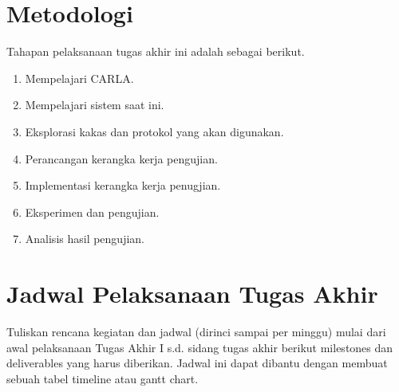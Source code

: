 \section{Metodologi}


Tahapan pelaksanaan tugas akhir ini adalah sebagai berikut.

\begin{enumerate}
	\item Mempelajari CARLA.
	\item Mempelajari sistem saat ini.
	\item Eksplorasi kakas dan protokol yang akan digunakan.
	\item Perancangan kerangka kerja pengujian.
	\item Implementasi kerangka kerja penugjian.
	\item Eksperimen dan pengujian.
	\item Analisis hasil pengujian.
\end{enumerate}

\section{Jadwal Pelaksanaan Tugas Akhir}

Tuliskan rencana kegiatan dan jadwal (dirinci sampai per minggu) mulai dari
awal pelaksanaan Tugas Akhir I s.d. sidang tugas akhir berikut milestones dan
deliverables yang harus diberikan. Jadwal ini dapat dibantu dengan membuat
sebuah tabel timeline atau gantt chart.
